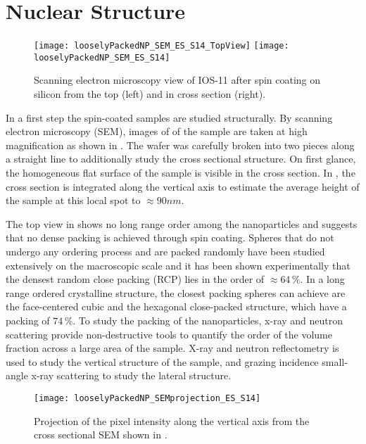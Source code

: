\documentclass[\main/dresen_thesis.tex]{subfiles}
\begin{document}
    \section{Nuclear Structure}
      \begin{figure}[tb]
        \centering
        \texttt{[image: looselyPackedNP\_SEM\_ES\_S14\_TopView]}
        \texttt{[image: looselyPackedNP\_SEM\_ES\_S14]}
        \caption{\label{fig:looselyPackedNP:nuclearStructure:sem}Scanning electron microscopy view of IOS-11 after spin coating on silicon from the top (left) and in cross section (right).}
      \end{figure}
      In a first step the spin-coated samples are studied structurally.
      By scanning electron microscopy (SEM), images of of the sample are taken at high magnification as shown in .
      The wafer was carefully broken into two pieces along a straight line to additionally study the cross sectional structure.
      On first glance, the homogeneous flat surface of the sample is visible in the cross section.
      In , the cross section is integrated along the vertical axis to estimate the average height of the sample at this local spot to $\approx 90 \unit{nm}$.

      The top view in  shows no long range order among the nanoparticles and suggests that no dense packing is achieved through spin coating.
      Spheres that do not undergo any ordering process and are packed randomly have been studied extensively on the macroscopic scale \cite{Torquato_2000_IsRan} and it has been shown experimentally that the densest random close packing (RCP) lies in the order of $\approx 64 \, \%$.
      In a long range ordered crystalline structure, the closest packing spheres can achieve are the face-centered cubic and the hexagonal close-packed structure, which have a packing of $74 \, \%$.
      To study the packing of the nanoparticles, x-ray and neutron scattering provide non-destructive tools to quantify the order of the volume fraction across a large area of the sample.
      X-ray and neutron reflectometry is used to study the vertical structure of the sample, and grazing incidence small-angle x-ray scattering to study the lateral structure.

      \begin{figure}[tb]
        \centering
        \texttt{[image: looselyPackedNP\_SEMprojection\_ES\_S14]}
        \caption{\label{fig:looselyPackedNP:nuclearStructure:semProjection}Projection of the pixel intensity along the vertical axis from the cross sectional SEM shown in .}
      \end{figure}
\end{document}
